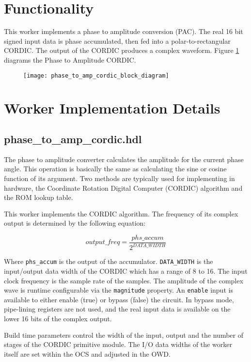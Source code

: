 \documentclass{article}
\def\comp{phase\_to\_amp\_cordic}
\begin{document}
\section*{Functionality}
\begin{flushleft}
	This worker implements a phase to amplitude conversion (PAC). The real 16 bit signed input data is phase accumulated, then fed into a polar-to-rectangular CORDIC. The output of the CORDIC produces a complex waveform. Figure \ref{fig:phase_to_amp_cordic} diagrams the Phase to Amplitude CORDIC.

	\begin{figure}[h]
		\centering\captionsetup{type=figure}\texttt{[image: phase\_to\_amp\_cordic\_block\_diagram]}
		\label{fig:phase_to_amp_cordic}
	\end{figure}
\end{flushleft}

\section*{Worker Implementation Details}
\subsection*{\comp.hdl}
\begin{flushleft}
	The phase to amplitude converter calculates the amplitude for the current phase angle.  This operation is basically the same as calculating the sine or cosine function of its argument.  Two methods are typically used for implementing in hardware, the Coordinate Rotation Digital Computer (CORDIC) algorithm and the ROM lookup table.\medskip

	This worker implements the CORDIC algorithm. The frequency of its complex output is determined by the following equation:

	\begin{equation} \label{eq:output_freq}
		output\_freq = \frac{phs\_accum}{2^{DATA\_WIDTH}}
	\end{equation}

	Where \verb+phs_accum+ is the output of the accumulator. \verb+DATA_WIDTH+ is the input/output data width of the CORDIC which has a range of 8 to 16. The input clock frequency is the sample rate of the samples. The amplitude of the complex wave is runtime configurable via the \verb+magnitude+ property.  An \verb+enable+ input is available to either enable (true) or bypass (false) the circuit. In bypass mode, pipe-lining registers are not used, and the real input data is available on the lower 16 bits of the complex output.\medskip

	Build time parameters control the width of the input, output and the number of stages of the CORDIC primitive module. The I/O data widths of the worker itself are set within the OCS and adjusted in the OWD.
\end{flushleft}
\end{document}
